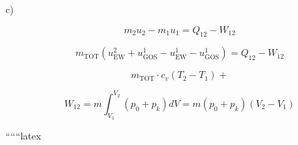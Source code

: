 c) \quad {}

\[
m_2 u_2 - m_1 u_1 = Q_{12} - W_{12}
\]

\[
m_{\text{TOT}} \left( u_{\text{EW}}^2 + u_{\text{GOS}}^1 - u_{\text{EW}}^1 - u_{\text{GOS}}^1 \right) = Q_{12} - W_{12}
\]

\[
m_{\text{TOT}} \cdot c_v \left( T_2 - T_1 \right) +
\]

\[
W_{12} = m \int_{V_1}^{V_2} \left( p_0 + p_k \right) dV = m \left( p_0 + p_k \right) \left( V_2 - V_1 \right)
\]

``````latex